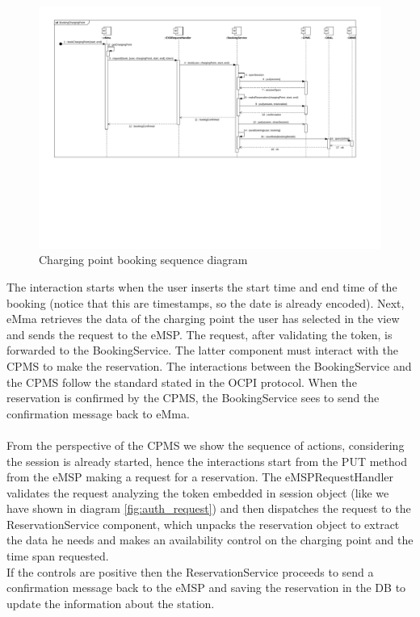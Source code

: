\begin{figure}[H]
    \centering
    \includegraphics[trim={0 4.5cm 0 0},clip, width=1\textwidth]{Images/cp2/runtime/Booking_emsp_view.pdf}
    \caption{Charging point booking sequence diagram}
\end{figure}
The interaction starts when the user inserts the start time and end time of the booking (notice that this are timestamps, so the date is already encoded). Next, eMma retrieves the data of the charging point the user has selected in the view and sends the request to the eMSP. The request, after validating the token, is forwarded to the BookingService. The latter component must interact with the CPMS to make the reservation. The interactions between the BookingService and the CPMS follow the standard stated in the OCPI protocol. When the reservation is confirmed by the CPMS, the BookingService sees to send the confirmation message back to eMma.\\
\\
From the perspective of the CPMS we show the sequence of actions, considering the session is already started, hence the interactions start from the PUT method from the eMSP making a request for a reservation. The eMSPRequestHandler validates the request analyzing the token embedded in session object (like we have shown in diagram \ref{fig:auth_request}) and then dispatches the request to the ReservationService component, which unpacks the reservation object to extract the data he needs and makes an availability control on the charging point and the time span requested. \\
If the controls are positive then the ReservationService proceeds to send a confirmation message back to the eMSP and saving the reservation in the DB to update the information about the station.
